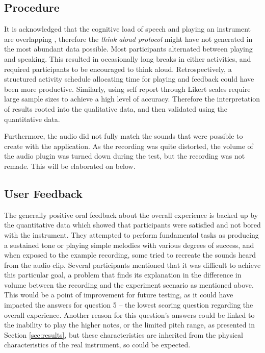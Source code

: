 \documentclass[dvipsnames, pdftex]{article}
\begin{document}
\subsection{Procedure}
It is acknowledged that the cognitive load of speech and playing an instrument are overlapping \cite{Stowell2009}, therefore the \textit{think aloud protocol} might have not generated in the most abundant data possible. Most participants alternated between playing and speaking. This resulted in occasionally long breaks in either activities, and required participants to be encouraged to think aloud. Retrospectively, a structured activity schedule allocating time for playing and feedback could have been more productive. Similarly, using self report through Likert scales require large sample sizes to achieve a high level of accuracy\cite{Stowell2009}. Therefore the interpretation of results rooted into the qualitative data, and then validated using the quantitative data. 

Furthermore, the audio did not fully match the sounds that were possible to create with the application. As the recording was quite distorted, the volume of the audio plugin was turned down during the test, but the recording was not remade. This will be elaborated on below.

\subsection{User Feedback}
The generally positive oral feedback about the overall experience is backed up by the quantitative data which showed that participants were satisfied and not bored with the instrument. They attempted to perform fundamental tasks as producing a sustained tone or playing simple melodies with various degrees of success, and when exposed to the example recording, some tried to recreate the sounds heard from the audio clip. Several participants mentioned that it was difficult to achieve this particular goal, a problem that finds its explanation in the difference in volume between the recording and the experiment scenario as mentioned above. This would be a point of improvement for future testing, as it could have impacted the answers for question 5 -- the lowest scoring question regarding the overall experience. Another reason for this question's answers could be linked to the inability to play the higher notes, or the limited pitch range, as presented in Section \ref{sec:results}, but these characteristics are inherited from the physical characteristics of the real instrument, so could be expected.
\end{document}
